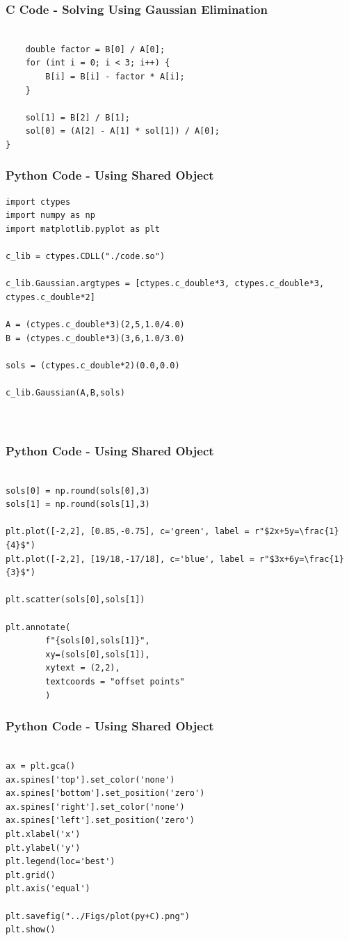 \documentclass{beamer}
\begin{document}
\begin{frame}[fragile]
    \frametitle{C Code - Solving Using Gaussian Elimination}

    \begin{lstlisting}
    
    double factor = B[0] / A[0];
    for (int i = 0; i < 3; i++) {
        B[i] = B[i] - factor * A[i];
    }

    sol[1] = B[2] / B[1];
    sol[0] = (A[2] - A[1] * sol[1]) / A[0];
}

    \end{lstlisting}

\end{frame}

\begin{frame}[fragile]
    \frametitle{Python Code - Using Shared Object}
    \begin{lstlisting}
import ctypes
import numpy as np
import matplotlib.pyplot as plt

c_lib = ctypes.CDLL("./code.so")

c_lib.Gaussian.argtypes = [ctypes.c_double*3, ctypes.c_double*3, ctypes.c_double*2]

A = (ctypes.c_double*3)(2,5,1.0/4.0)
B = (ctypes.c_double*3)(3,6,1.0/3.0)

sols = (ctypes.c_double*2)(0.0,0.0)

c_lib.Gaussian(A,B,sols)



\end{lstlisting}
\end{frame}

\begin{frame}[fragile]
    \frametitle{Python Code - Using Shared Object}
    \begin{lstlisting}

sols[0] = np.round(sols[0],3)
sols[1] = np.round(sols[1],3)

plt.plot([-2,2], [0.85,-0.75], c='green', label = r"$2x+5y=\frac{1}{4}$")
plt.plot([-2,2], [19/18,-17/18], c='blue', label = r"$3x+6y=\frac{1}{3}$")

plt.scatter(sols[0],sols[1])

plt.annotate(
        f"{sols[0],sols[1]}",
        xy=(sols[0],sols[1]),
        xytext = (2,2),
        textcoords = "offset points"
        )

\end{lstlisting}
\end{frame}

\begin{frame}[fragile]
    \frametitle{Python Code - Using Shared Object}
    \begin{lstlisting}
    
ax = plt.gca()
ax.spines['top'].set_color('none')
ax.spines['bottom'].set_position('zero')
ax.spines['right'].set_color('none')
ax.spines['left'].set_position('zero')
plt.xlabel('x')
plt.ylabel('y')
plt.legend(loc='best')
plt.grid()
plt.axis('equal')

plt.savefig("../Figs/plot(py+C).png")
plt.show()

\end{lstlisting}
\end{frame}
\end{document}
